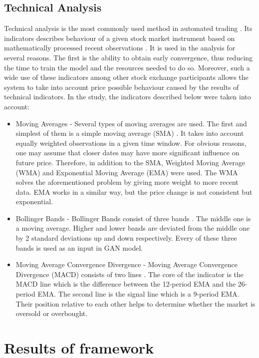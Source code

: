 \documentclass[11pt]{article} %
\begin{document}
\subsection{Technical Analysis}
Technical analysis is the most commonly used method in automated trading \cite{at2}. Its indicators describes behaviour of a given stock market instrument based on mathematically processed recent observations \cite{at2}. It is used in the analysis for several reasons. The first is the ability to obtain early convergence, thus reducing the time to train the model and the resources needed to do so. Moreover, such a wide use of these indicators among other stock exchange participants allows the system to take into account price possible behaviour caused by the results of technical indicators. In the study, the indicators described below were taken into account: 
\begin{itemize}
\item Moving Averages - Several types of moving averages are used. The first and simplest of them is a simple moving average (SMA) \cite{ma}. It takes into account equally weighted observations in a given time window. For obvious reasons, one may assume that closer dates may have more significant influence on future price. Therefore, in addition to the SMA, Weighted Moving Average (WMA) \cite{wma} and Exponential Moving Average (EMA) \cite{ema} were used. The WMA solves the aforementioned problem by giving more weight to more recent data. EMA works in a similar way, but the price change is not consistent but exponential.

\item Bollinger Bands - Bollinger Bands consist of three bands \cite{bb}. The middle one is a moving average. Higher and lower bands are deviated from the middle one by 2 standard deviations up and down respectively. Every of these three bands is used as an input in GAN model.

\item Moving Average Convergence Divergence - Moving Average Convergence Divergence (MACD) consists of two lines \cite{macd}. The core of the indicator is the MACD line which is the difference between the 12-period EMA and the 26-period EMA. The second line is the signal line which is a 9-period EMA. Their position relative to each other helps to determine whether the market is oversold or overbought.
\end{itemize}

\section{Results of framework}
\end{document}
